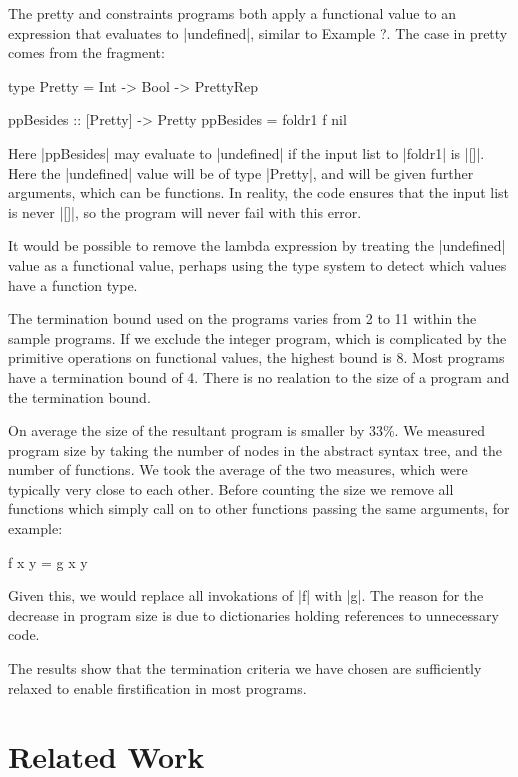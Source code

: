 \documentclass[preprint]{sigplanconf}
\begin{document}
The pretty and constraints programs both apply a functional value to an expression that evaluates to |undefined|, similar to Example ?. The case in pretty comes from the fragment:

\begin{code}
type Pretty = Int -> Bool -> PrettyRep

ppBesides     :: [Pretty] -> Pretty
ppBesides = foldr1 f nil
\end{code}

Here |ppBesides| may evaluate to |undefined| if the input list to |foldr1| is |[]|. Here the |undefined| value will be of type |Pretty|, and will be given further arguments, which can be functions. In reality, the code ensures that the input list is never |[]|, so the program will never fail with this error.

It would be possible to remove the lambda expression by treating the |undefined| value as a functional value, perhaps using the type system to detect which values have a function type.

The termination bound used on the programs varies from 2 to 11 within the sample programs. If we exclude the integer program, which is complicated by the primitive operations on functional values, the highest bound is 8. Most programs have a termination bound of 4. There is no realation to the size of a program and the termination bound.

On average the size of the resultant program is smaller by 33\%. We measured program size by taking the number of nodes in the abstract syntax tree, and the number of functions. We took the average of the two measures, which were typically very close to each other. Before counting the size we remove all functions which simply call on to other functions passing the same arguments, for example:

\begin{code}
f x y = g x y
\end{code}

Given this, we would replace all invokations of |f| with |g|. The reason for the decrease in program size is due to dictionaries holding references to unnecessary code.

The results show that the termination criteria we have chosen are sufficiently relaxed to enable firstification in most programs.

\section{Related Work}
\end{document}
